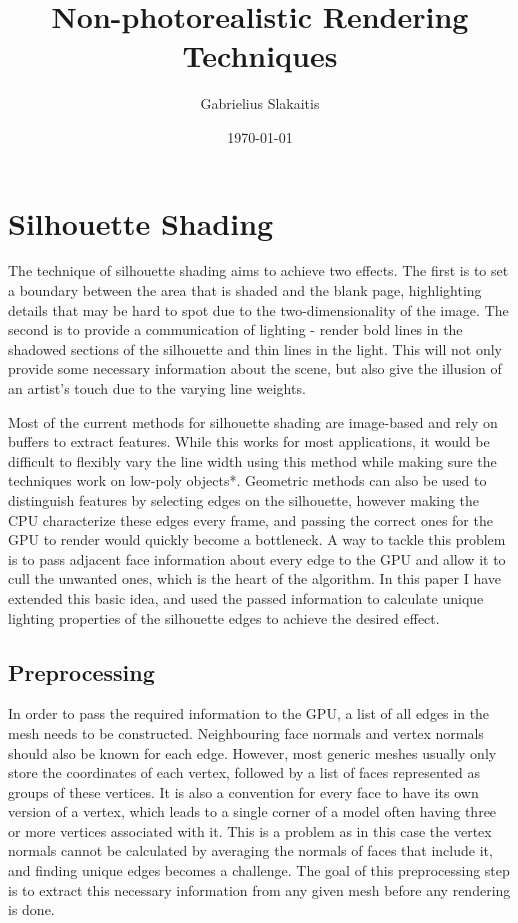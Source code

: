 \documentclass[a4paper, 12pt]{article}
\begin{document}
\title{Non-photorealistic Rendering Techniques}
\author{Gabrielius Slakaitis}
\date{\today}
\maketitle

\newpage
\section{Silhouette Shading}
The technique of silhouette shading aims to achieve two effects. The first is to set a boundary between the area that is shaded and the blank page, highlighting details that may be hard to spot due to the two-dimensionality of the image. The second is to provide a communication of lighting - render bold lines in the shadowed sections of the silhouette and thin lines in the light. This will not only provide some necessary information about the scene, but also give the illusion of an artist's touch due to the varying line weights.

Most of the current methods for silhouette shading are image-based and rely on buffers to extract features. While this works for most applications, it would be difficult to flexibly vary the line width using this method while making sure the techniques work on low-poly objects*. Geometric methods can also be used to distinguish features by selecting edges on the silhouette, however making the CPU characterize these edges every frame, and passing the correct ones for the GPU to render would quickly become a bottleneck. A way to tackle this problem is to pass adjacent face information about every edge to the GPU and allow it to cull the unwanted ones, which is the heart of the algorithm. In this paper I have extended this basic idea, and used the passed information to calculate unique lighting properties of the silhouette edges to achieve the desired effect.


\subsection{Preprocessing}
In order to pass the required information to the GPU, a list of all edges in the mesh needs to be constructed. Neighbouring face normals and vertex normals should also be known for each edge. However, most generic meshes usually only store the coordinates of each vertex, followed by a list of faces represented as groups of these vertices. It is also a convention for every face to have its own version of a vertex, which leads to a single corner of a model often having three or more vertices associated with it. This is a problem as in this case the vertex normals cannot be calculated by averaging the normals of faces that include it, and finding unique edges becomes a challenge. The goal of this preprocessing step is to extract this necessary information from any given mesh before any rendering is done.
\end{document}
